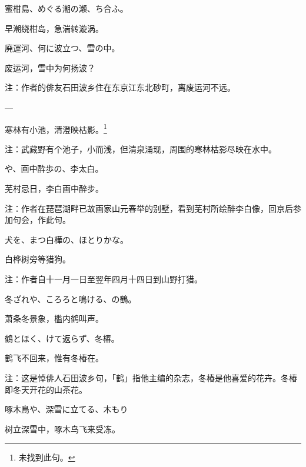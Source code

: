 \begin{haiku}
    {\FH 蜜柑島、めぐる潮の瀬、ち合ふ。}

    {\FK 早潮绕柑岛，急湍转漩涡。}
\end{haiku}

\begin{haiku}
    {\FH 廃運河、何に波立つ、雪の中。}

    {\FK 废运河，雪中为何扬波？}

    {\FT 注：作者的俳友石田波乡住在东京江东北砂町，离废运河不远。}
\end{haiku}

\begin{haiku}
    {\FH ---}

    {\FK 寒林有小池，清澄映枯影。\footnote{\FT 未找到此句。}}

    {\FT 注：武藏野有个池子，小而浅，但清泉涌现，周围的寒林枯影尽映在水中。}
\end{haiku}

\begin{haiku}
    {\FH {}や、画中酔歩の、李太白。}

    {\FK 芜村忌日，李白画中醉步。}

    {\FT 注：作者在琵琶湖畔已故画家山元春举的别墅，看到芜村所绘醉李白像，回京后参加句会，作此句。}
\end{haiku}

\begin{haiku}
    {\FH {}犬を、まつ白樺の、ほとりかな。}

    {\FK 白桦树旁等猎狗。}

    {\FT 注：作者自十一月一日至翌年四月十四日到山野打猎。}
\end{haiku}

\begin{haiku}
    {\FH 冬ざれや、ころろと鳴ける、の鶴。}

    {\FK 萧条冬景象，槛内鹤叫声。}
\end{haiku}

\begin{haiku}
    {\FH 鶴とほく、けて返らず、冬椿。}

    {\FK 鹤飞不回来，惟有冬椿在。}

    {\FT 注：这是悼俳人石田波乡句，「鹤」指他主编的杂志，冬椿是他喜爱的花卉。冬椿即冬天开花的山茶花。}
\end{haiku}

\begin{haiku}
    {\FH 啄木鳥や、深雪に立てる、木もり}

    {\FK 树立深雪中，啄木鸟飞来受冻。}
\end{haiku}


